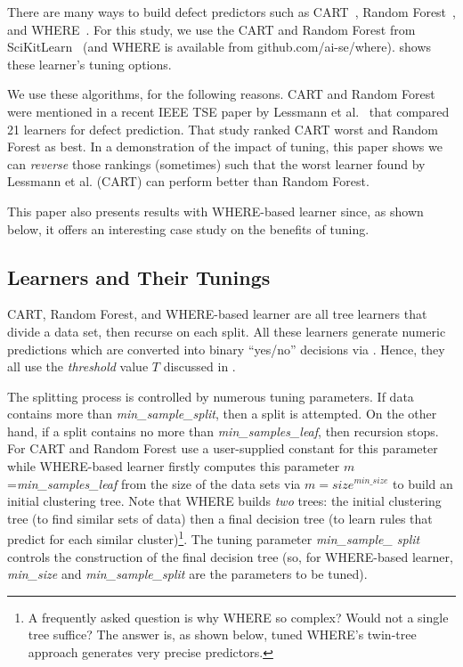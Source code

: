 There are many ways to build defect predictors
such as  CART~\cite{brieman00}, Random Forest~\cite{breiman84}, 
and WHERE~\cite{menzies2013local}.
For this study, we use the CART and Random Forest  from 
SciKitLearn~\cite{scikit-learn} (and
WHERE is available from
github.com/ai-se/where).
 shows these learner's tuning options.


 We use  these algorithms, for the following reasons.
CART and Random Forest were mentioned in
a recent IEEE TSE paper by Lessmann et al.~\cite{lessmann2008benchmarking} that compared 21  
learners for  defect prediction.
That study ranked  CART  worst  and Random Forest as best.
In a demonstration of the impact of tuning,
this paper shows  we can {\em reverse} those rankings (sometimes)
such that  the worst learner found by Lessmann et al. (CART) can perform better
than Random Forest.

This
 paper also presents results with WHERE-based learner since, as shown below,
it offers an interesting case study on the benefits of tuning.
  

\subsection{Learners and Their Tunings}

CART, Random Forest, and WHERE-based learner are all  tree learners that divide a data set, then recurse
on each split.
All these learners
generate numeric predictions which are converted
into binary ``yes/no'' decisions via . Hence, they all use the {\em threshold} value $T$ discussed in .

The splitting process is controlled by numerous tuning parameters.
If data contains more than {\em min\_sample\_split}, then a split is attempted.
On the other hand, if a split contains no more than {\em min\_samples\_leaf}, then recursion stops. For CART and Random Forest use a 
user-supplied constant for this parameter while
WHERE-based learner firstly computes this parameter $m$={\em min\_samples\_leaf} from the size of the data
sets via  $m=\mathit{size}^\mathit{min\_size}$ to build an initial  clustering tree.
Note that WHERE builds {\em two} trees: the initial clustering tree (to find similar sets of data)
then a final decision tree (to learn rules that predict for each similar cluster)\footnote{A
frequently asked question is why WHERE so complex?
Would not   a single tree suffice? The answer is, as shown below,  tuned WHERE's twin-tree approach 
generates very precise predictors.}.
The tuning parameter  {\em min\_sample\_ split } controls the construction of the
final decision tree (so, for WHERE-based learner,
{\em min\_size} and {\em min\_sample\_split} are the parameters to be tuned).

